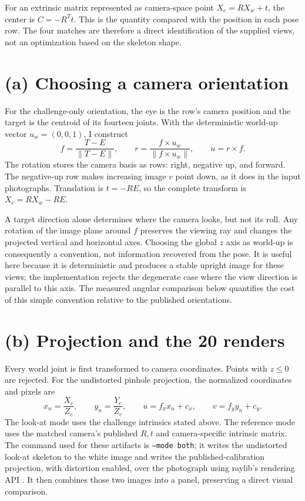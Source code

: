 \documentclass[11pt]{article}
\begin{document}
For an extrinsic matrix represented as camera-space point
$X_c=RX_w+t$, the center is $C=-R^Tt$.  This is the quantity compared with
the position in each pose row.  The four matches are therefore a direct
identification of the supplied views, not an optimization based on the
skeleton shape.

\section{(a) Choosing a camera orientation}
For the challenge-only orientation, the eye is the row's camera position and
the target is the centroid of its fourteen joints.  With the deterministic
world-up vector $u_w=(0,0,1)$, I construct
\[
 f=\frac{T-E}{\lVert T-E\rVert},\qquad
 r=\frac{f\times u_w}{\lVert f\times u_w\rVert},\qquad
 u=r\times f.
\]
The rotation stores the camera basis as rows: right, negative up, and forward.
The negative-up row makes increasing image $v$ point down, as it does in the
input photographs.  Translation is $t=-RE$, so the complete transform is
$X_c=R X_w-RE$.

A target direction alone determines where the camera looks, but not its roll.
Any rotation of the image plane around $f$ preserves the viewing ray and changes
the projected vertical and horizontal axes.  Choosing the global $z$ axis as
world-up is consequently a convention, not information recovered from the
pose.  It is useful here because it is deterministic and produces a stable
upright image for these views; the implementation rejects the degenerate case
where the view direction is parallel to this axis.  The measured angular
comparison below quantifies the cost of this simple convention relative to the
published orientations.

\section{(b) Projection and the 20 renders}
Every world joint is first transformed to camera coordinates.  Points with
$z\leq0$ are rejected.  For the undistorted pinhole projection, the normalized
coordinates and pixels are
\[
 x_n=\frac{X_c}{Z_c},\qquad y_n=\frac{Y_c}{Z_c},\qquad
 u=f_xx_n+c_x,\qquad v=f_yy_n+c_y.
\]
The look-at mode uses the challenge intrinsics stated above.  The reference
mode uses the matched camera's published $R,t$ and camera-specific intrinsic
matrix.  The command used for these artifacts is \texttt{--mode both}; it
writes the undistorted look-at skeleton to the white image and writes the
published-calibration projection, with distortion enabled, over the
photograph using raylib's rendering API \cite{raylib}.  It then combines those two
images into a panel, preserving a direct visual comparison.
\end{document}
